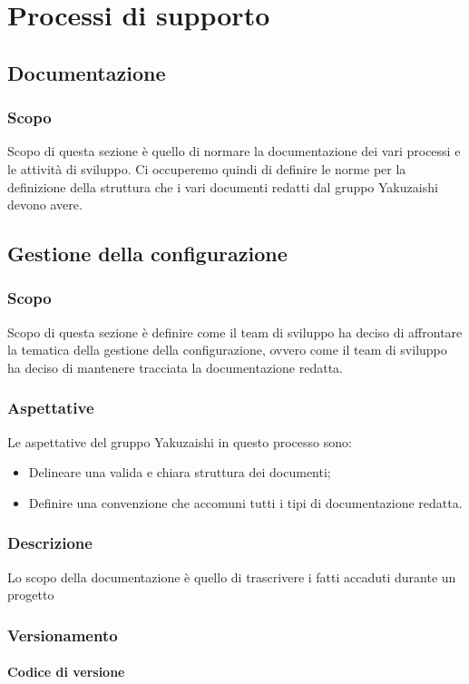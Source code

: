 \section{Processi di supporto}\label{section:processi_supporto}
\subsection{Documentazione}
\subsubsection{Scopo}\label{subsubsection: scopo}
Scopo di questa sezione è quello di normare la documentazione dei vari processi e le attività di sviluppo.
Ci occuperemo quindi di definire le norme per la definizione della struttura che i vari documenti redatti dal gruppo Yakuzaishi devono avere.
\subsection{Gestione della configurazione}\label{subsection:gestione_configurazione}
\subsubsection{Scopo}
Scopo di questa sezione è definire come il team di sviluppo ha deciso di affrontare la tematica della gestione della configurazione, ovvero come il team di sviluppo ha deciso di mantenere tracciata la documentazione redatta.
\subsubsection{Aspettative}
Le aspettative del gruppo Yakuzaishi in questo processo sono:
\begin{itemize}
    \item Delineare una valida e chiara struttura dei documenti;
    \item Definire una convenzione che accomuni tutti i tipi di documentazione redatta.
 \end {itemize}
\subsubsection{Descrizione}
Lo scopo della documentazione è quello di trascrivere i fatti accaduti durante un progetto
\subsubsection{Versionamento}
\paragraph{Codice di versione}
